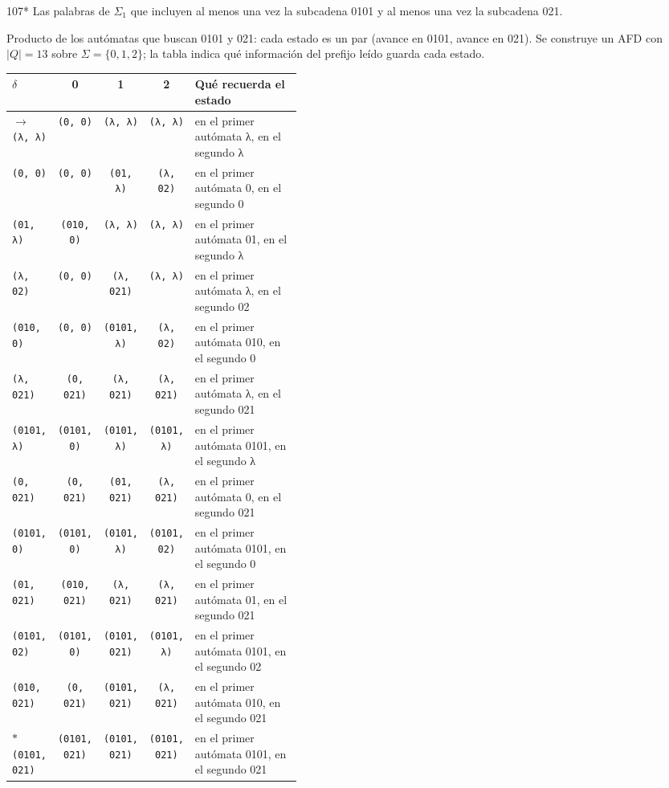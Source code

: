 \documentclass[11pt]{article}
\begin{document}
\begin{ejercicio}{107}{*}
Las palabras de $\Sigma_1$ que incluyen al menos una vez la subcadena 0101 y al menos una vez la subcadena 021.
\end{ejercicio}
\proc Producto de los autómatas que buscan 0101 y 021: cada estado es un par (avance en 0101, avance en 021). Se construye un AFD con $|Q| = 13$ sobre $\Sigma = \{0, 1, 2\}$; la tabla indica qué información del prefijo leído guarda cada estado.
\begin{center}\small\begin{tabular}{lcccp{0.42\linewidth}}\toprule
$\delta$ & 0 & 1 & 2 & Qué recuerda el estado \\\midrule
$\to$ \texttt{(λ, λ)} & \texttt{(0, 0)} & \texttt{(λ, λ)} & \texttt{(λ, λ)} & en el primer autómata λ, en el segundo λ \\
 \texttt{(0, 0)} & \texttt{(0, 0)} & \texttt{(01, λ)} & \texttt{(λ, 02)} & en el primer autómata 0, en el segundo 0 \\
 \texttt{(01, λ)} & \texttt{(010, 0)} & \texttt{(λ, λ)} & \texttt{(λ, λ)} & en el primer autómata 01, en el segundo λ \\
 \texttt{(λ, 02)} & \texttt{(0, 0)} & \texttt{(λ, 021)} & \texttt{(λ, λ)} & en el primer autómata λ, en el segundo 02 \\
 \texttt{(010, 0)} & \texttt{(0, 0)} & \texttt{(0101, λ)} & \texttt{(λ, 02)} & en el primer autómata 010, en el segundo 0 \\
 \texttt{(λ, 021)} & \texttt{(0, 021)} & \texttt{(λ, 021)} & \texttt{(λ, 021)} & en el primer autómata λ, en el segundo 021 \\
 \texttt{(0101, λ)} & \texttt{(0101, 0)} & \texttt{(0101, λ)} & \texttt{(0101, λ)} & en el primer autómata 0101, en el segundo λ \\
 \texttt{(0, 021)} & \texttt{(0, 021)} & \texttt{(01, 021)} & \texttt{(λ, 021)} & en el primer autómata 0, en el segundo 021 \\
 \texttt{(0101, 0)} & \texttt{(0101, 0)} & \texttt{(0101, λ)} & \texttt{(0101, 02)} & en el primer autómata 0101, en el segundo 0 \\
 \texttt{(01, 021)} & \texttt{(010, 021)} & \texttt{(λ, 021)} & \texttt{(λ, 021)} & en el primer autómata 01, en el segundo 021 \\
 \texttt{(0101, 02)} & \texttt{(0101, 0)} & \texttt{(0101, 021)} & \texttt{(0101, λ)} & en el primer autómata 0101, en el segundo 02 \\
 \texttt{(010, 021)} & \texttt{(0, 021)} & \texttt{(0101, 021)} & \texttt{(λ, 021)} & en el primer autómata 010, en el segundo 021 \\
$*$ \texttt{(0101, 021)} & \texttt{(0101, 021)} & \texttt{(0101, 021)} & \texttt{(0101, 021)} & en el primer autómata 0101, en el segundo 021 \\
\bottomrule\end{tabular}\end{center}
\end{document}
